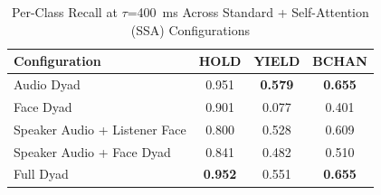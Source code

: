 \begin{table}[h]
\caption{Per-Class Recall at $\tau$=400~ms Across Standard + Self-Attention (SSA) Configurations}
\label{tab:recall_per_class_ssa}
\small
\renewcommand{\arraystretch}{1.20}
\begin{tabular}{>{\raggedright\arraybackslash}p{4cm}ccc}
\toprule
Configuration & HOLD & YIELD & BCHAN \\
\midrule
Audio Dyad & 0.951 & \textbf{0.579} & \textbf{0.655} \\
Face Dyad & 0.901 & 0.077 & 0.401 \\
Speaker Audio + Listener Face & 0.800 & 0.528 & 0.609 \\
Speaker Audio + Face Dyad & 0.841 & 0.482 & 0.510 \\
Full Dyad & \textbf{0.952} & 0.551 & \textbf{0.655} \\
\bottomrule
\end{tabular}
\end{table}
